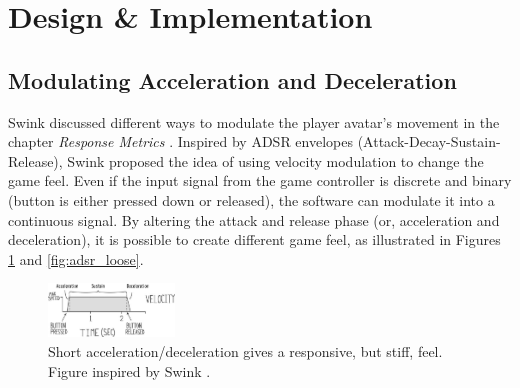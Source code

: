 \section{Design \& Implementation} \label{design}
\subsection{Modulating Acceleration and Deceleration}
Swink discussed different ways to modulate the player avatar's movement in the chapter \textit{Response Metrics} \cite{swink}. Inspired by ADSR envelopes (Attack-Decay-Sustain-Release), Swink proposed the idea of using velocity modulation to change the game feel. Even if the input signal from the game controller is discrete and binary (button is either pressed down or released), the software can modulate it into a continuous signal. By altering the attack and release phase (or, acceleration and deceleration), it is possible to create different game feel, as illustrated in Figures \ref{fig:adsr_stiff} and \ref{fig:adsr_loose}.





\begin{figure}[htbp]
\centering
\includegraphics[width=0.30\textwidth]{Pics/adsr_stiff}
\caption{Short acceleration/deceleration gives a responsive, but stiff, feel. Figure inspired by Swink \cite{swink}.}
\label{fig:adsr_stiff}
\end{figure}

